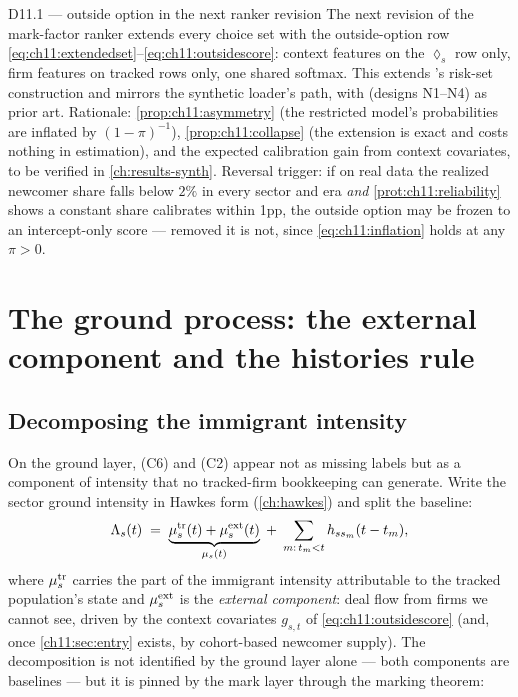 \begin{decision}{D11.1 --- outside option in the next ranker revision}
The next revision of the mark-factor ranker extends every choice set with
the outside-option row \cref{eq:ch11:extendedset}--\cref{eq:ch11:outsidescore}:
context features on the $\lozenge_s$ row only, firm features on tracked
rows only, one shared softmax. This extends
's risk-set construction and mirrors the
synthetic loader's 
path, with  (designs
N1--N4) as prior art. Rationale: \cref{prop:ch11:asymmetry} (the
restricted model's probabilities are inflated by $(1-\pi)^{-1}$),
\cref{prop:ch11:collapse} (the extension is exact and costs nothing in
estimation), and the expected calibration gain from context covariates,
to be verified in \cref{ch:results-synth}.
Reversal trigger: if on real data the realized newcomer share falls below
$2\%$ in every sector and era \emph{and}
\cref{prot:ch11:reliability} shows a constant share calibrates within
1pp, the outside option may be frozen to an intercept-only score ---
removed it is not, since \cref{eq:ch11:inflation} holds at any $\pi>0$.
\end{decision}

\section{The ground process: the external component and the histories rule}\label{ch11:sec:ground}

\subsection{Decomposing the immigrant intensity}\label{ch11:sec:mudecomp}

On the ground layer, (C6) and (C2) appear not as missing labels but as a
component of intensity that no tracked-firm bookkeeping can generate.
Write the sector ground intensity in Hawkes form
(\cref{ch:hawkes}) and split the baseline:
\begin{equation}\label{eq:ch11:mudecomp}
\Lambda_s(t)
 \;=\;
 \underbrace{\mu_s^{\mathrm{tr}}(t) + \mu_s^{\mathrm{ext}}(t)}_{\mu_s(t)}
 \;+\; \sum_{m:\, t_m < t} h_{s s_m}(t - t_m),
\end{equation}
where $\mu_s^{\mathrm{tr}}$ carries the part of the immigrant intensity
attributable to the tracked population's state and
$\mu_s^{\mathrm{ext}}$ is the \emph{external component}: deal flow from
firms we cannot see, driven by the context covariates $g_{s,t}$ of
\cref{eq:ch11:outsidescore} (and, once \cref{ch11:sec:entry} exists, by
cohort-based newcomer supply). The decomposition is not identified by the
ground layer alone --- both components are baselines --- but it is pinned
by the mark layer through the marking theorem:

